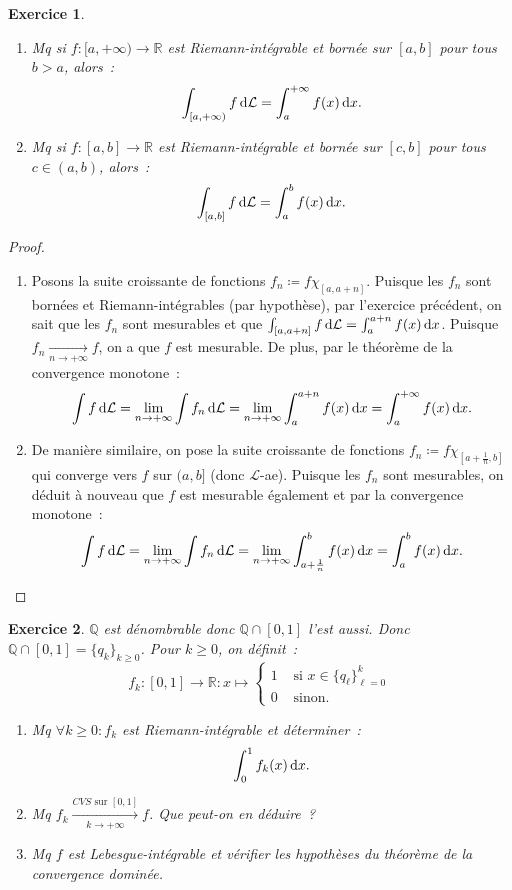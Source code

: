 \documentclass{article}
\newtheorem{ex}{Exercice}[section]
\newcommand{\pinfty}{{+\infty}}
\newcommand{\Q}{{\mathbb Q}}
\newcommand{\R}{{\mathbb R}}
\begin{document}
\begin{ex}~
\begin{enumerate}
	\item Mq si $f : [a, \pinfty) \to \R$ est Riemann-intégrable et bornée sur $[a, b]$ pour tous $b > a$, alors~:
	\[\int_{[a, \pinfty)}f\dif\mathcal L = \int_a^\pinfty f(x)\dif x.\]
	\item Mq si $f : [a, b] \to \R$ est Riemann-intégrable et bornée sur $[c, b]$ pour tous $c \in (a, b)$, alors~:
	\[\int_{[a, b]}f\dif\mathcal L = \int_a^bf(x)\dif x.\]
\end{enumerate}
\end{ex}

\begin{proof}~
\begin{enumerate}
	\item Posons la suite croissante de fonctions $f_n \coloneqq f\chi_{[a, a+n]}$. Puisque les $f_n$ sont bornées et Riemann-intégrables (par hypothèse), par l'exercice précédent,
	on sait que les $f_n$ sont mesurables et que $\int_{[a, a+n]}f\dif\mathcal L = \int_a^{a+n}f(x)\dif x$. Puisque $f_n \xrightarrow[n \to \pinfty]{} f$, on
	a que $f$ est mesurable. De plus, par le théorème de la convergence monotone~:
	\[\int f\dif\mathcal L = \lim_{n \to \pinfty}\int f_n\dif\mathcal L = \lim_{n \to \pinfty}\int_a^{a+n}f(x)\dif x = \int_a^\pinfty f(x)\dif x.\]

	\item De manière similaire, on pose la suite croissante de fonctions $f_n \coloneqq f\chi_{[a+\frac 1n, b]}$ qui converge vers $f$ sur $(a, b]$ (donc $\mathcal L$-ae).
	Puisque les $f_n$ sont mesurables, on déduit à nouveau que $f$ est mesurable également et par la convergence monotone~:
	\[\int f\dif\mathcal L = \lim_{n \to \pinfty}\int f_n\dif\mathcal L = \lim_{n \to \pinfty}\int_{a+\frac 1n}^bf(x)\dif x = \int_a^bf(x)\dif x.\]
\end{enumerate}
\end{proof}

\begin{ex} $\Q$ est dénombrable donc $\Q \cap [0, 1]$ l'est aussi. Donc $\Q \cap [0, 1] = \{q_k\}_{k \geq 0}$. Pour $k \geq 0$, on définit~:
\[f_k : [0, 1] \to \R : x \mapsto \begin{cases}1 &\text{ si } x \in \{q_\ell\}_{\ell=0}^k \\0 &\text{ sinon}.\end{cases}\]

\begin{enumerate}
	\item Mq $\forall k \geq 0 : f_k$ est Riemann-intégrable et déterminer~:
	\[\int_0^1f_k(x)\dif x.\]
	\item Mq $f_k \xrightarrow[k \to \pinfty]{CVS \text{ sur } [0, 1]} f$. Que peut-on en déduire~?
	\item Mq $f$ est Lebesgue-intégrable et vérifier les hypothèses du théorème de la convergence dominée.
\end{enumerate}
\end{ex}
\end{document}
